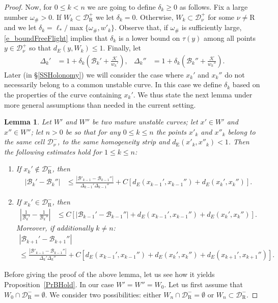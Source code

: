 \documentclass[10pt]{amsart}
\newtheorem{lemm}[theo]{Lemma}\newtheorem{prop}[theo]{Proposition}\newtheorem{coro}[theo]{Corollary}\newtheorem{conj}[theo]{Conjecture}
\theoremstyle{definition}\newtheorem{defi}[theo]{Definition}\newtheorem{rema}[theo]{Remark}\newtheorem{exam}[theo]{Example}\newtheorem{exem}[theo]{Example}\newtheorem{nota}[theo]{Notation}
\newcommand{\cB}{\mathcal{B}}
\newcommand{\cK}{\mathcal{K}}
\newcommand{\cell}{\mathcal{D}}
\newcommand{\privatel}[1]{#1_*}
\newcommand{\elll}{\privatel{\ell}}
\newcommand{\recoPrivate}{\mathrm{R}}
\newcommand{\reco}{{\cell^-_{\recoPrivate}}}
\newcommand{\backReco}{{\cell^+_{\recoPrivate}}}
\newcommand{\eum}{_\text{E}}
\newcommand{\law}[1]{\omega_{#1}}
\newcommand{\lawc}{\law{\#}}
\newcommand{\indCell}{\nu}
\newcommand*{\relabel}{\renewcommand{\labelenumi}{(\theenumi)}}
\newcommand*{\alphenumi}{\renewcommand*{\theenumi}{\alph{enumi}}\relabel}
\begin{document}
\begin{proof}
Now, for $0\le k < n$ we are going to define $\delta_{k}\ge0$ as follows. Fix a large number $\lawc > 0$. If $W_{k}\subset \backReco$ we let $\delta_{k}=0$. Otherwise, $W_{k}\subset\cell_{\indCell}^{+}$ for some $\indCell\ne\text{R}$ and we let $\delta_{k} = \elll/\max\{\lawc,w'_{k}\}$. Observe that, if $\lawc$ is sufficiently large, \eqref{e_boundFreeFlight} implies that $\delta_{k}$ is a lower bound on $\tau(y)$ among all points $y\in\cell_{\indCell}^{+}$ so that $d_{E}(y,W_{k})\le 1$. Finally, let
\begin{align*}
\Delta_k' &=1+\delta_{k} \left(\cB_{k}'+\frac{\cK}{w_k'}\right),&
\Delta_k''&=1+\delta_{k} \left(\cB_{k}''+\frac{\cK}{w_k''}\right).
\end{align*}
Later (in \S\ref{SSHolonomy}) we will consider the case where $x_k'$ and $x_k''$ do not necessarily belong to a common unstable curve. In this case we define $\delta_{k}$ based on the properties of the curve containing $x_{k}'$. We thus state the next lemma under more general assumptions than needed in the current setting.
\begin{lemm} \label{LmB1-2step}
Let $W'$ and $W''$ be two mature unstable curves; let $x'\in W'$ and $x''\in W''$; let $n > 0$ be so that for any $0\le k\le n$ the points $x'_k$ and $x''_k$ belong to the same cell $\cell_{\indCell}^{-}$, to the same homogeneity strip and $d\eum(x'_{k}, x''_{k}) < 1$. Then the following estimates hold for $1 \le k\le n$:
\begin{enumerate}\alphenumi
\item\label{lemm5.3.1} If $x_k'\not\in\reco$, then
\begin{align*}
\left| \cB_k'-\cB_k''\right| &\le\frac{\left|\cB'_{k-1}-\cB_{k-1}''\right|}{\Delta_{k-1}' \Delta_{k-1}''}+ C
\left[d_E\left(x_{k-1}', x_{k-1}''\right)+d_E\left(x_{k}', x_{k}''\right)\right].
\end{align*}
\item\label{lemm5.3.2} If $x_k'\in\reco$, then
\begin{align}\label{B2Lip}
\left|\frac1{\cB_k'}-\frac1{\cB_k''}\right|&\leq C
\left[\left|\cB_{k-1}'-\cB_{k-1}''\right|+d_E\left(x_{k-1}', x_{k-1}''\right)+d_E(x_{k}', x_{k}'')\right].
\end{align}
Moreover, if additionally $k \ne n$:
\begin{multline*}
\left| \cB_{k+1}'-\cB_{k+1}''\right| \\
\le\frac{\left|\cB'_{k-1}-\cB_{k-1}''\right|}{\Delta_{k}' \Delta_{k}''}
 + C
\left[d_E\left(x_{k-1}', x_{k-1}''\right) + d_E\left(x_{k}', x_{k}''\right) + d_E\left(x_{k+1}', x_{k+1}''\right) \right].
\end{multline*}
\end{enumerate}
\end{lemm} Before giving the proof of the above lemma, let us see how it yields Proposition~\ref{PrBHold}. In our case $W' = W'' = W_0$. Let us first assume that $W_{0}\cap\reco = \emptyset$. We consider two possibilities: either $W_{n}\cap\reco = \emptyset$ or $W_{n}\subset\reco$.


\end{proof}
\end{document}

